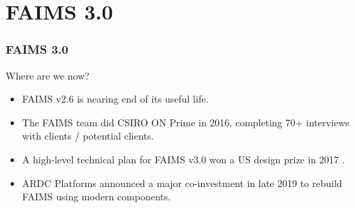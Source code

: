

\section{FAIMS 3.0}

\begin{sectionframe} %
	\frametitle{FAIMS 3.0}


\end{sectionframe}


\begin{frame}{Where are we now?}
    \begin{itemize}
        \item FAIMS v2.6 is nearing end of its useful life.
        \item The FAIMS team did CSIRO ON Prime in 2016, completing 70+ interviews with clients / potential clients.
        \item A high-level technical plan for FAIMS v3.0 won a US design prize in 2017 \parencite{Bureau_of_Reclamation2017-xl}.
        \item ARDC Platforms announced a major co-investment in late 2019 to rebuild FAIMS using modern components.
    \end{itemize}
\end{frame}


